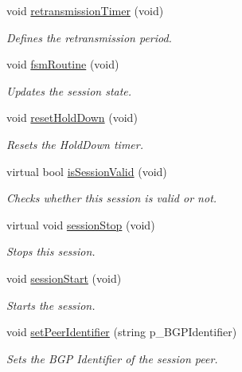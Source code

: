 \begin{DoxyCompactItemize}
void \hyperlink{classBGPSession_a895d45ac921090bcb8c87d95f2803e4b}{retransmission\-Timer} (void)
\begin{DoxyCompactList}\small\item\em Defines the retransmission period. \end{DoxyCompactList}\item 
\hypertarget{classBGPSession_aef60141c520d454fe87b50d070991212}{void \hyperlink{classBGPSession_aef60141c520d454fe87b50d070991212}{fsm\-Routine} (void)}\label{classBGPSession_aef60141c520d454fe87b50d070991212}

\begin{DoxyCompactList}\small\item\em Updates the session state. \end{DoxyCompactList}\item 
void \hyperlink{classBGPSession_a76d3bf3338ea7b3127999db4de73ec42}{reset\-Hold\-Down} (void)
\begin{DoxyCompactList}\small\item\em Resets the Hold\-Down timer. \end{DoxyCompactList}\item 
virtual bool \hyperlink{classBGPSession_a158bba46b42ee14afcac2bf53c68b309}{is\-Session\-Valid} (void)
\begin{DoxyCompactList}\small\item\em Checks whether this session is valid or not. \end{DoxyCompactList}\item 
virtual void \hyperlink{classBGPSession_a88e9285b17a692c2989923ad87b0587e}{session\-Stop} (void)
\begin{DoxyCompactList}\small\item\em Stops this session. \end{DoxyCompactList}\item 
void \hyperlink{classBGPSession_a1f47d3d32cc7c058bbefbad70a8596ea}{session\-Start} (void)
\begin{DoxyCompactList}\small\item\em Starts the session. \end{DoxyCompactList}\item 
void \hyperlink{classBGPSession_a41d56303c1f4fdfc6c51f869ac243998}{set\-Peer\-Identifier} (string p\-\_\-\-B\-G\-P\-Identifier)
\begin{DoxyCompactList}\small\item\em Sets the B\-G\-P Identifier of the session peer. \end{DoxyCompactList}\item 

\end{DoxyCompactItemize}
